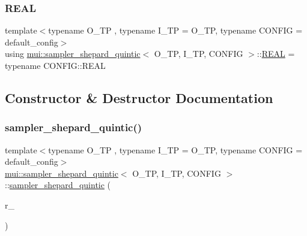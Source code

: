 \mbox{\label{classmui_1_1sampler__shepard__quintic_ae674072eac8556d3520cf5f6c1eb7ae6}} 
\subsubsection{\texorpdfstring{R\+E\+AL}{REAL}}
{\footnotesize\ttfamily template$<$typename O\+\_\+\+TP , typename I\+\_\+\+TP  = O\+\_\+\+TP, typename C\+O\+N\+F\+IG  = default\+\_\+config$>$ \\
using \hyperlink{classmui_1_1sampler__shepard__quintic}{mui\+::sampler\+\_\+shepard\+\_\+quintic}$<$ O\+\_\+\+TP, I\+\_\+\+TP, C\+O\+N\+F\+IG $>$\+::\hyperlink{classmui_1_1sampler__shepard__quintic_ae674072eac8556d3520cf5f6c1eb7ae6}{R\+E\+AL} =  typename C\+O\+N\+F\+I\+G\+::\+R\+E\+AL}



\subsection{Constructor \& Destructor Documentation}
\mbox{\label{classmui_1_1sampler__shepard__quintic_a6cf881d7f4900fd07287c1b8c9392834}} 
\subsubsection{\texorpdfstring{sampler\+\_\+shepard\+\_\+quintic()}{sampler\_shepard\_quintic()}}
{\footnotesize\ttfamily template$<$typename O\+\_\+\+TP , typename I\+\_\+\+TP  = O\+\_\+\+TP, typename C\+O\+N\+F\+IG  = default\+\_\+config$>$ \\
\hyperlink{classmui_1_1sampler__shepard__quintic}{mui\+::sampler\+\_\+shepard\+\_\+quintic}$<$ O\+\_\+\+TP, I\+\_\+\+TP, C\+O\+N\+F\+IG $>$\+::\hyperlink{classmui_1_1sampler__shepard__quintic}{sampler\+\_\+shepard\+\_\+quintic} (\begin{DoxyParamCaption}\item[{\hyperlink{classmui_1_1sampler__shepard__quintic_ae674072eac8556d3520cf5f6c1eb7ae6}{R\+E\+AL}}]{r\+\_\+ }\end{DoxyParamCaption})\hspace{0.3cm}{\ttfamily [inline]}}



